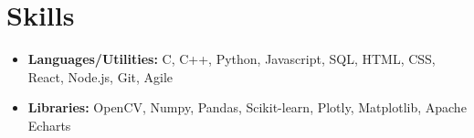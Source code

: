 \documentclass[10.8pt, a4paper]{extarticle}
\newcommand{\shorterSection}[1]{\vspace{-10pt}\section{#1}}
\begin{document}

\shorterSection{Skills}
\vspace{-2pt}
\begin{itemize}
    \item \textbf{Languages/Utilities:} C, C++, Python, Javascript, SQL, HTML, CSS, React, Node.js, Git, Agile
    \item \textbf{Libraries:} OpenCV, Numpy, Pandas, Scikit-learn, Plotly, Matplotlib, Apache Echarts
\end{itemize}
\vspace{0.055cm}
\end{document}
